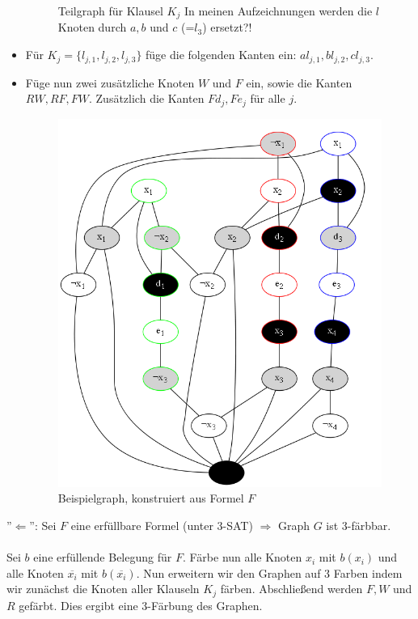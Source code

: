 \documentclass{article} %
\begin{document}
\begin{itemize}
\begin{figure}[!htp]
		\caption{Teilgraph für Klausel $K_j$ {\LARGE \color{red} In meinen Aufzeichnungen werden die $l$ Knoten durch $a,b$ und $c$ (=$l_3$) ersetzt?! }}
	\end{figure}
	\item Für $K_j = \{l_{j,1}, l_{j,2}, l_{j,3}\}$ füge die folgenden Kanten ein: $al_{j,1}, bl_{j,2}, cl_{j,3}$.
	\item Füge nun zwei zusätzliche Knoten $W$ und $F$ ein, sowie die Kanten $RW, RF, FW$. Zusätzlich die Kanten $Fd_j, Fe_j$ für alle $j$.
	\begin{figure}[!htp]
		\centering
		\includegraphics[scale=0.5]{img/3Sat_3Col_example.png}
		\caption{Beispielgraph, konstruiert aus Formel $F$}
	\end{figure}
\end{itemize}
\newpage
''$\Leftarrow$'': Sei $F$ eine erfüllbare Formel (unter 3-SAT) $\Rightarrow$ Graph $G$ ist 3-färbbar.\\
\\
Sei $b$ eine erfüllende Belegung für $F$. Färbe nun alle Knoten $x_i$ mit $b(x_i)$ und alle Knoten $\overline{x_i}$ mit $b(\overline{x_i})$. Nun erweitern wir den Graphen auf 3 Farben indem wir zunächst die Knoten aller Klauseln $K_j$ färben. Abschließend werden $F, W$ und $R$ gefärbt. Dies ergibt eine 3-Färbung des Graphen.
\end{document}
